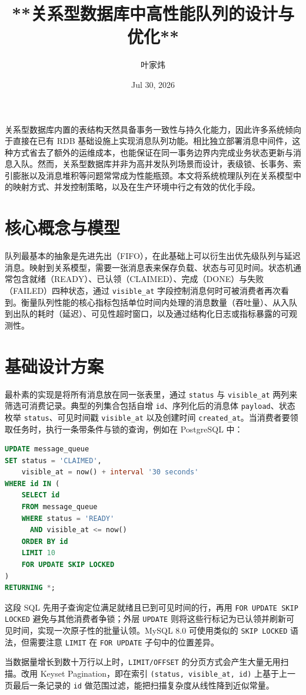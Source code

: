 \title{**关系型数据库中高性能队列的设计与优化**}
\author{叶家炜}
\date{Jul 30, 2026}
\maketitle
关系型数据库内置的表结构天然具备事务一致性与持久化能力，因此许多系统倾向于直接在已有 RDB 基础设施上实现消息队列功能。相比独立部署消息中间件，这种方式省去了额外的运维成本，也能保证在同一事务边界内完成业务状态更新与消息入队。然而，关系型数据库并非为高并发队列场景而设计，表级锁、长事务、索引膨胀以及消息堆积等问题常常成为性能瓶颈。本文将系统梳理队列在关系模型中的映射方式、并发控制策略，以及在生产环境中行之有效的优化手段。\par
\chapter{核心概念与模型}
队列最基本的抽象是先进先出（FIFO），在此基础上可以衍生出优先级队列与延迟消息。映射到关系模型，需要一张消息表来保存负载、状态与可见时间。状态机通常包含就绪（READY）、已认领（CLAIMED）、完成（DONE）与失败（FAILED）四种状态，通过 \texttt{visible\_{}at} 字段控制消息何时可被消费者再次看到。衡量队列性能的核心指标包括单位时间内处理的消息数量（吞吐量）、从入队到出队的耗时（延迟）、可见性超时窗口，以及通过结构化日志或指标暴露的可观测性。\par
\chapter{基础设计方案}
最朴素的实现是将所有消息放在同一张表里，通过 \texttt{status} 与 \texttt{visible\_{}at} 两列来筛选可消费记录。典型的列集合包括自增 \texttt{id}、序列化后的消息体 \texttt{payload}、状态枚举 \texttt{status}、可见时间戳 \texttt{visible\_{}at} 以及创建时间 \texttt{created\_{}at}。当消费者要领取任务时，执行一条带条件与锁的查询，例如在 PostgreSQL 中：\par
\begin{lstlisting}[language=sql]
UPDATE message_queue
SET status = 'CLAIMED',
    visible_at = now() + interval '30 seconds'
WHERE id IN (
    SELECT id
    FROM message_queue
    WHERE status = 'READY'
      AND visible_at <= now()
    ORDER BY id
    LIMIT 10
    FOR UPDATE SKIP LOCKED
)
RETURNING *;
\end{lstlisting}
这段 SQL 先用子查询定位满足就绪且已到可见时间的行，再用 \texttt{FOR UPDATE SKIP LOCKED} 避免与其他消费者争锁；外层 \texttt{UPDATE} 则将这些行标记为已认领并刷新可见时间，实现一次原子性的批量认领。MySQL 8.0 可使用类似的 \texttt{SKIP LOCKED} 语法，但需要注意 \texttt{LIMIT} 在 \texttt{FOR UPDATE} 子句中的位置差异。\par
当数据量增长到数十万行以上时，\texttt{LIMIT/OFFSET} 的分页方式会产生大量无用扫描。改用 Keyset Pagination，即在索引 \texttt{(status, visible\_{}at, id)} 上基于上一页最后一条记录的 \texttt{id} 做范围过滤，能把扫描复杂度从线性降到近似常量。\par
